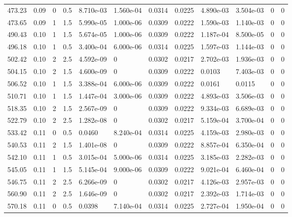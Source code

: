 \documentclass[preview]{standalone}
\begin{document}
{{{\begin{tabular}{L{1.2cm}C{1.2cm} C{0.3cm}C{0.5cm} C{1.4cm}C{1.4cm} C{1.4cm}C{1.4cm} C{1.6cm}C{1.6cm} C{1.6cm}C{1.6cm}}
  473.23  &  0.09  & 0     & 0.5 &  8.710e-03  & 1.560e-04  &  0.0314&   0.0225& 4.890e-03 & 3.504e-03   &  0 & 0  \\ 
  473.65  &  0.09  & 1     & 1.5 &  5.990e-05  & 1.000e-06  &  0.0309&   0.0222& 1.590e-03 & 1.140e-03   &  0 & 0  \\ 
  490.43  &  0.10  & 1     & 1.5 &  5.674e-05  & 1.000e-06  &  0.0309&   0.0222& 1.187e-04 & 8.500e-05   &  0 & 0  \\ 
  496.18  &  0.10  & 1     & 0.5 &  3.400e-04  & 6.000e-06  &  0.0314&   0.0225& 1.597e-03 & 1.144e-03   &  0 & 0  \\ 
  502.42  &  0.10  & 2     & 2.5 &  4.592e-09  & 0  &  0.0302&   0.0217& 2.702e-03 & 1.936e-03   &  0 & 0  \\ 
  504.15  &  0.10  & 2     & 1.5 &  4.600e-09  & 0  &  0.0309&   0.0222& 0.0103 & 7.403e-03   &  0 & 0  \\ 
  506.52  &  0.10  & 1     & 1.5 &  3.388e-04  & 6.000e-06  &  0.0309&   0.0222& 0.0161 & 0.0115   &  0 & 0  \\ 
  510.71  &  0.10  & 1     & 1.5 &  1.447e-04  & 3.000e-06  &  0.0309&   0.0222& 4.893e-03 & 3.506e-03   &  0 & 0  \\ 
  518.35  &  0.10  & 2     & 1.5 &  2.567e-09  & 0  &  0.0309&   0.0222& 9.334e-03 & 6.689e-03   &  0 & 0  \\ 
  522.79  &  0.10  & 2     & 2.5 &  1.282e-08  & 0  &  0.0302&   0.0217& 5.159e-04 & 3.700e-04   &  0 & 0  \\ 
  533.42  &  0.11  & 0     & 0.5 &  0.0460  & 8.240e-04  &  0.0314&   0.0225& 4.159e-03 & 2.980e-03   &  0 & 0  \\ 
  540.53  &  0.11  & 2     & 1.5 &  1.401e-08  & 0  &  0.0309&   0.0222& 8.857e-04 & 6.350e-04   &  0 & 0  \\ 
  542.10  &  0.11  & 1     & 0.5 &  3.015e-04  & 5.000e-06  &  0.0314&   0.0225& 3.185e-03 & 2.282e-03   &  0 & 0  \\ 
  545.05  &  0.11  & 1     & 1.5 &  5.145e-04  & 9.000e-06  &  0.0309&   0.0222& 9.021e-04 & 6.460e-04   &  0 & 0  \\ 
  546.75  &  0.11  & 2     & 2.5 &  6.266e-09  & 0  &  0.0302&   0.0217& 4.126e-03 & 2.957e-03   &  0 & 0  \\ 
  560.90  &  0.11  & 2     & 2.5 &  1.646e-09  & 0  &  0.0302&   0.0217& 2.392e-03 & 1.714e-03   &  0 & 0  \\ 
  570.18  &  0.11  & 0     & 0.5 &  0.0398  & 7.140e-04  &  0.0314&   0.0225& 2.727e-04 & 1.950e-04   &  0 & 0  \\ 

\end{tabular}}}}
\end{document}
